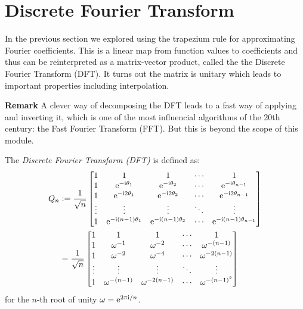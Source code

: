 
\section{Discrete Fourier Transform}
In the previous section we explored using the trapezium rule for approximating Fourier coefficients. This is a linear map from function values to coefficients and thus can be reinterpreted as a matrix-vector product, called the the Discrete Fourier Transform (DFT). It turns out the matrix is unitary which leads to important properties including interpolation. 

\textbf{Remark} A clever way of decomposing the DFT leads to a fast way of applying and inverting it, which is one of the most influencial algorithms of the 20th century: the Fast Fourier Transform (FFT). But this is beyond the scope of this module.

\begin{definition}[DFT] The \emph{Discrete Fourier Transform (DFT)} is defined as:
\begin{align*}
Q_n &:= {1 \over \sqrt{n}} \begin{bmatrix} 1 & 1 & 1&  \ensuremath{\cdots} & 1 \\
                                    1 & {\rm e}^{-\I \ensuremath{\theta}_1} & {\rm e}^{-\I \ensuremath{\theta}_2} & \ensuremath{\cdots} & {\rm e}^{-\I \ensuremath{\theta}_{n-1}} \\
                                    1 & {\rm e}^{-\I 2 \ensuremath{\theta}_1} & {\rm e}^{-\I 2 \ensuremath{\theta}_2} & \ensuremath{\cdots} & {\rm e}^{-\I 2\ensuremath{\theta}_{n-1}} \\
                                    \ensuremath{\vdots} & \ensuremath{\vdots} & \ensuremath{\vdots} & \ensuremath{\ddots} & \ensuremath{\vdots} \\
                                    1 & {\rm e}^{-\I (n-1) \ensuremath{\theta}_1} & {\rm e}^{-\I (n-1) \ensuremath{\theta}_2} & \ensuremath{\cdots} & {\rm e}^{-\I (n-1) \ensuremath{\theta}_{n-1}}
\end{bmatrix} \\
&= {1 \over \sqrt{n}} \begin{bmatrix} 1 & 1 & 1&  \ensuremath{\cdots} & 1 \\
                                    1 & \ensuremath{\omega}^{-1} & \ensuremath{\omega}^{-2} & \ensuremath{\cdots} & \ensuremath{\omega}^{-(n-1)}\\
                                    1 & \ensuremath{\omega}^{-2} & \ensuremath{\omega}^{-4} & \ensuremath{\cdots} & \ensuremath{\omega}^{-2(n-1)}\\
                                    \ensuremath{\vdots} & \ensuremath{\vdots} & \ensuremath{\vdots} & \ensuremath{\ddots} & \ensuremath{\vdots} \\
                                    1 & \ensuremath{\omega}^{-(n-1)} & \ensuremath{\omega}^{-2(n-1)} & \ensuremath{\cdots} & \ensuremath{\omega}^{-(n-1)^2}
\end{bmatrix}
\end{align*}
for the $n$-th root of unity $\omega = {\rm e}^{2\pi{\rm i}/n}$.  \end{definition}

